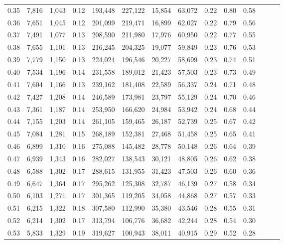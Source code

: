 \begin{tabular}{rrrrrrrrrrrrrr}
0.35 &  7,816 &  1,043 &  0.12 &  193,448 &  227,122 &  15,854 &  63,072 &  0.22 &  0.80 &      0.58 \\
0.36 &  7,651 &  1,045 &  0.12 &  201,099 &  219,471 &  16,899 &  62,027 &  0.22 &  0.79 &      0.56 \\
0.37 &  7,491 &  1,077 &  0.13 &  208,590 &  211,980 &  17,976 &  60,950 &  0.22 &  0.77 &      0.55 \\
0.38 &  7,655 &  1,101 &  0.13 &  216,245 &  204,325 &  19,077 &  59,849 &  0.23 &  0.76 &      0.53 \\
0.39 &  7,779 &  1,150 &  0.13 &  224,024 &  196,546 &  20,227 &  58,699 &  0.23 &  0.74 &      0.51 \\
0.40 &  7,534 &  1,196 &  0.14 &  231,558 &  189,012 &  21,423 &  57,503 &  0.23 &  0.73 &      0.49 \\
0.41 &  7,604 &  1,166 &  0.13 &  239,162 &  181,408 &  22,589 &  56,337 &  0.24 &  0.71 &      0.48 \\
0.42 &  7,427 &  1,208 &  0.14 &  246,589 &  173,981 &  23,797 &  55,129 &  0.24 &  0.70 &      0.46 \\
0.43 &  7,361 &  1,187 &  0.14 &  253,950 &  166,620 &  24,984 &  53,942 &  0.24 &  0.68 &      0.44 \\
0.44 &  7,155 &  1,203 &  0.14 &  261,105 &  159,465 &  26,187 &  52,739 &  0.25 &  0.67 &      0.42 \\
0.45 &  7,084 &  1,281 &  0.15 &  268,189 &  152,381 &  27,468 &  51,458 &  0.25 &  0.65 &      0.41 \\
0.46 &  6,899 &  1,310 &  0.16 &  275,088 &  145,482 &  28,778 &  50,148 &  0.26 &  0.64 &      0.39 \\
0.47 &  6,939 &  1,343 &  0.16 &  282,027 &  138,543 &  30,121 &  48,805 &  0.26 &  0.62 &      0.38 \\
0.48 &  6,588 &  1,302 &  0.17 &  288,615 &  131,955 &  31,423 &  47,503 &  0.26 &  0.60 &      0.36 \\
0.49 &  6,647 &  1,364 &  0.17 &  295,262 &  125,308 &  32,787 &  46,139 &  0.27 &  0.58 &      0.34 \\
0.50 &  6,103 &  1,271 &  0.17 &  301,365 &  119,205 &  34,058 &  44,868 &  0.27 &  0.57 &      0.33 \\
0.51 &  6,215 &  1,322 &  0.18 &  307,580 &  112,990 &  35,380 &  43,546 &  0.28 &  0.55 &      0.31 \\
0.52 &  6,214 &  1,302 &  0.17 &  313,794 &  106,776 &  36,682 &  42,244 &  0.28 &  0.54 &      0.30 \\
0.53 &  5,833 &  1,329 &  0.19 &  319,627 &  100,943 &  38,011 &  40,915 &  0.29 &  0.52 &      0.28 \\

\end{tabular}
